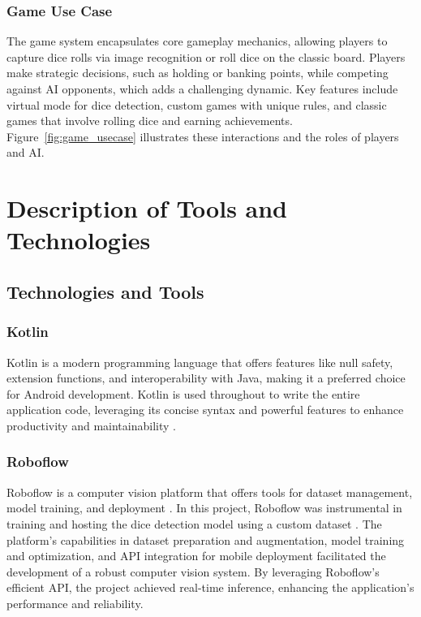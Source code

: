 \subsubsection{Game Use Case}
The game system encapsulates core gameplay mechanics, allowing players to capture dice rolls via image recognition or roll dice on the classic board. Players make strategic decisions, such as holding or banking points, while competing against AI opponents, which adds a challenging dynamic. Key features include virtual mode for dice detection, custom games with unique rules, and classic games that involve rolling dice and earning achievements. Figure~\ref{fig:game_usecase} illustrates these interactions and the roles of players and AI.

\section{Description of Tools and Technologies}
\subsection{Technologies and Tools}
\subsubsection{Kotlin}
Kotlin is a modern programming language that offers features like null safety, extension functions, and interoperability with Java, making it a preferred choice for Android development. Kotlin is used throughout to write the entire application code, leveraging its concise syntax and powerful features to enhance productivity and maintainability \cite{bib:kotlin}.

\subsubsection{Roboflow}
Roboflow is a computer vision platform that offers tools for dataset management, model training, and deployment \cite{bib:roboflow}. In this project, Roboflow was instrumental in training and hosting the dice detection model using a custom dataset \cite{bib:kavidataset}. The platform's capabilities in dataset preparation and augmentation, model training and optimization, and API integration for mobile deployment facilitated the development of a robust computer vision system. By leveraging Roboflow's efficient API, the project achieved real-time inference, enhancing the application's performance and reliability.

